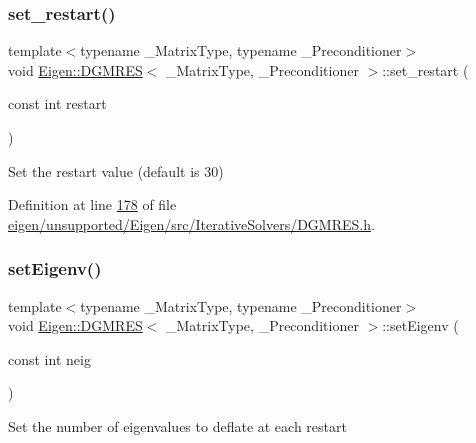 \subsubsection{\texorpdfstring{set\+\_\+restart()}{set\_restart()}\hspace{0.1cm}{\footnotesize\ttfamily [2/2]}}
{\footnotesize\ttfamily template$<$typename \+\_\+\+Matrix\+Type, typename \+\_\+\+Preconditioner$>$ \\
void \hyperlink{class_eigen_1_1_d_g_m_r_e_s}{Eigen\+::\+D\+G\+M\+R\+ES}$<$ \+\_\+\+Matrix\+Type, \+\_\+\+Preconditioner $>$\+::set\+\_\+restart (\begin{DoxyParamCaption}\item[{const int}]{restart }\end{DoxyParamCaption})\hspace{0.3cm}{\ttfamily [inline]}}

Set the restart value (default is 30) 

Definition at line \hyperlink{eigen_2unsupported_2_eigen_2src_2_iterative_solvers_2_d_g_m_r_e_s_8h_source_l00178}{178} of file \hyperlink{eigen_2unsupported_2_eigen_2src_2_iterative_solvers_2_d_g_m_r_e_s_8h_source}{eigen/unsupported/\+Eigen/src/\+Iterative\+Solvers/\+D\+G\+M\+R\+E\+S.\+h}.

\mbox{\label{class_eigen_1_1_d_g_m_r_e_s_a7510f3ded5959a8d98c3cd3aabebc84b}} 
\subsubsection{\texorpdfstring{set\+Eigenv()}{setEigenv()}\hspace{0.1cm}{\footnotesize\ttfamily [1/2]}}
{\footnotesize\ttfamily template$<$typename \+\_\+\+Matrix\+Type, typename \+\_\+\+Preconditioner$>$ \\
void \hyperlink{class_eigen_1_1_d_g_m_r_e_s}{Eigen\+::\+D\+G\+M\+R\+ES}$<$ \+\_\+\+Matrix\+Type, \+\_\+\+Preconditioner $>$\+::set\+Eigenv (\begin{DoxyParamCaption}\item[{const int}]{neig }\end{DoxyParamCaption})\hspace{0.3cm}{\ttfamily [inline]}}

Set the number of eigenvalues to deflate at each restart 

